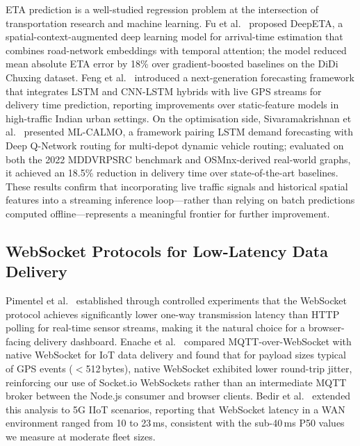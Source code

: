 \documentclass[conference]{IEEEtran}
\begin{document}
ETA prediction is a well-studied regression problem at the intersection
of transportation research and machine learning. Fu et
al.~\cite{fu2020deepeta} proposed DeepETA, a spatial-context-augmented
deep learning model for arrival-time estimation that combines
road-network embeddings with temporal attention; the model reduced
mean absolute ETA error by 18\% over gradient-boosted baselines on
the DiDi Chuxing dataset. Feng et al.~\cite{feng2024nextgen}
introduced a next-generation forecasting framework that integrates
LSTM and CNN-LSTM hybrids with live GPS streams for delivery time
prediction, reporting improvements over static-feature models in
high-traffic Indian urban settings. On the optimisation side,
Sivaramakrishnan et al.~\cite{sivaramakrishnan2025mlcalmo} presented
ML-CALMO, a framework pairing LSTM demand forecasting with Deep
Q-Network routing for multi-depot dynamic vehicle routing; evaluated
on both the 2022 MDDVRPSRC benchmark and OSMnx-derived real-world
graphs, it achieved an 18.5\% reduction in delivery time over
state-of-the-art baselines. These results confirm that incorporating
live traffic signals and historical spatial features into a streaming
inference loop—rather than relying on batch predictions computed
offline—represents a meaningful frontier for further improvement.

\subsection{WebSocket Protocols for Low-Latency Data Delivery}

Pimentel et al.~\cite{pimentel2012websocket} established through
controlled experiments that the WebSocket protocol achieves
significantly lower one-way transmission latency than HTTP polling
for real-time sensor streams, making it the natural choice for
a browser-facing delivery dashboard. Enache et
al.~\cite{enache2023mqtt} compared MQTT-over-WebSocket with native
WebSocket for IoT data delivery and found that for payload sizes
typical of GPS events ($<$512\,bytes), native WebSocket exhibited
lower round-trip jitter, reinforcing our use of Socket.io WebSockets
rather than an intermediate MQTT broker between the Node.js consumer
and browser clients. Bedir et al.~\cite{bedir2025websocket} extended
this analysis to 5G IIoT scenarios, reporting that WebSocket latency
in a WAN environment ranged from 10 to 23\,ms, consistent with
the sub-40\,ms P50 values we measure at moderate fleet sizes.

\end{document}
